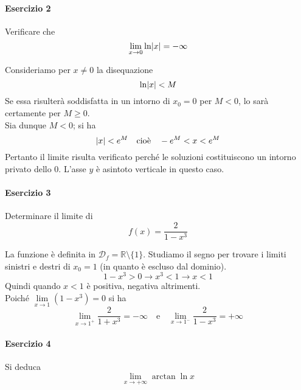 \paragraph{Esercizio 2}
Verificare che
\begin{equation*}
\lim\limits_{x\to0}\ln\lvert x\rvert=-\infty
\end{equation*}
\divisor

Consideriamo per $x\neq0$ la disequazione
\begin{equation*}
\ln\lvert x\rvert<M
\end{equation*}
Se essa risulterà soddisfatta in un intorno di $x_0=0$ per $M<0$, lo sarà certamente per $M\geq0$.\\
Sia dunque $M<0$; si ha
\begin{equation*}
\lvert x\rvert<e^M\quad\text{cioè}\quad-e^M<x<e^M
\end{equation*}
Pertanto il limite risulta verificato perché le soluzioni costituiscono un intorno privato dello $0$.
L'asse $y$ è asintoto verticale in questo caso.

\paragraph{Esercizio 3}
Determinare il limite di
\begin{equation*}
f(x)=\frac{2}{1-x^3}
\end{equation*}
\divisor

La funzione è definita in $\mathscr{D}_f=\mathbb{R}\setminus\{1\}$. Studiamo il segno per trovare
i limiti sinistri e destri di $x_0=1$ (in quanto è escluso dal dominio).
\begin{equation*}
1-x^3>0\rightarrow x^3<1\rightarrow x<1
\end{equation*}
Quindi quando $x<1$ è positiva, negativa altrimenti.\\
Poiché $\lim\limits_{x\to1}(1-x^3)=0$ si ha
\begin{equation*}
\boxed{\lim\limits_{x\to1^+}\frac{2}{1+x^3}=-\infty}\quad\text{e}\quad
\boxed{\lim\limits_{x\to1^-}\frac{2}{1-x^3}=+\infty}
\end{equation*}

\paragraph{Esercizio 4}
Si deduca
\begin{equation*}
\lim\limits_{x\to+\infty}\arctan\ln x
\end{equation*}
\divisor

